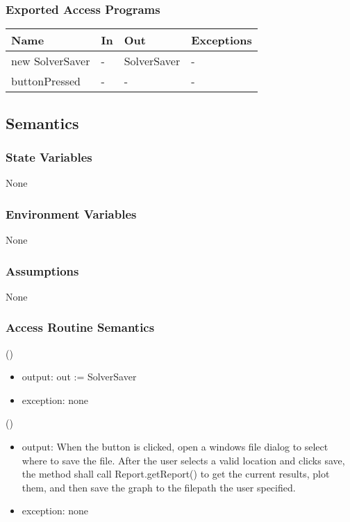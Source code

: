 \documentclass[12pt, titlepage]{article}
\begin{document}
\subsubsection{Exported Access Programs}
\begin{center}
\begin{tabular}{p{5cm} p{2cm} p{4cm} p{5.5cm}}
\hline
\textbf{Name} & \textbf{In} & \textbf{Out} & \textbf{Exceptions} \\
\hline
new SolverSaver & - & SolverSaver & - \\
\hline
buttonPressed & - & - & - \\
\hline
\end{tabular}
\end{center}

\subsection{Semantics}

\subsubsection{State Variables}
None
\subsubsection{Environment Variables}
None
\subsubsection{Assumptions}
None
\subsubsection{Access Routine Semantics}

()
\begin{itemize}  
\item output: out :=  SolverSaver
\item exception: none
\end{itemize}

()
\begin{itemize}
\item output: When the button is clicked, open a windows file dialog to select where to save the file. After the user selects a valid location and clicks save, the method shall call Report.getReport() to get the current results, plot them, and then save the graph to the filepath the user specified.
\item exception: none
\end{itemize}
\end{document}
